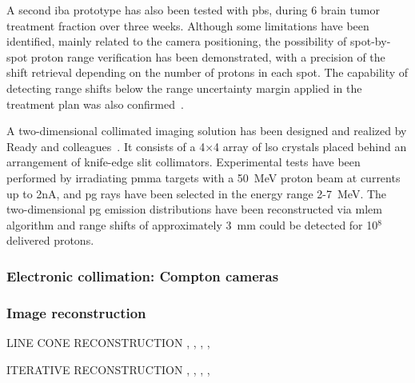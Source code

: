 A second \gls{iba} prototype has also been tested with \gls{pbs}, during 6 brain tumor treatment fraction over three weeks. Although some limitations have been identified, mainly related to the camera positioning, the possibility of spot-by-spot proton range verification has been demonstrated, with a precision of the shift retrieval depending on the number of protons in each spot. The capability of detecting range shifts below the range uncertainty margin applied in the treatment plan was also confirmed~\parencite{Xie2017}.

A two-dimensional collimated imaging solution has been designed and realized by Ready and colleagues~\parencite{Ready2016PHD, Ready2016}. It consists of a 4$\times$4 array of \gls{lso} crystals placed behind an arrangement of knife-edge slit collimators. Experimental tests have been performed by irradiating \gls{pmma} targets with a 50~MeV proton beam at currents up to 2nA, and \gls{pg} rays have been selected in the energy range 2-7~MeV. The two-dimensional \gls{pg} emission distributions have been reconstructed via \gls{mlem} algorithm and range shifts of approximately 3~mm could be detected for 10$^8$ delivered protons.   

\subsubsection{Electronic collimation: Compton cameras}\label{chap2::subsubsec::PGI_elecColl}


\subsubsection{Image reconstruction}\label{chap2::subsubsec::PGI_reconstruction}
LINE CONE RECONSTRUCTION \parencite{Cree1994}, \parencite{Basko1998}, \parencite{Parra1999}, \parencite{Hirasawa2003}, \parencite{Maxim2009} 

ITERATIVE RECONSTRUCTION \parencite{Schone2010}, \parencite{Zoglauer2011}, \parencite{Gillam2011}, \parencite{Lojacono2013}, \parencite{Mackin2012}

\clearpage
